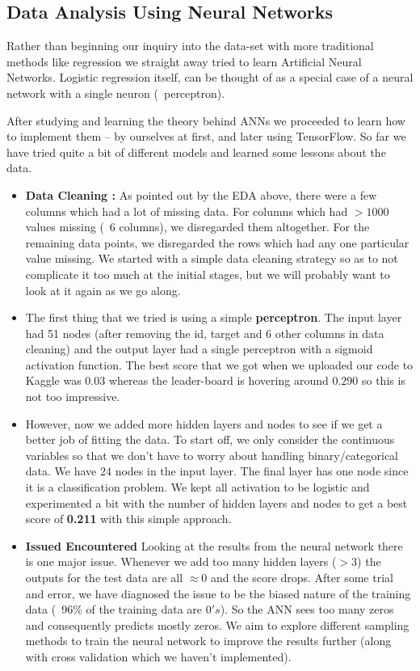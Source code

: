 \subsection{Data Analysis Using Neural Networks}

Rather than beginning our inquiry into the data-set with more traditional methods like regression we straight away tried to learn Artificial Neural Networks. Logistic regression itself, can be thought of as a special case of a neural network with a single neuron (~perceptron). 

After studying and learning the theory behind ANNs we proceeded to learn how to implement them -- by ourselves at first, and later using TensorFlow. So far we have tried quite a bit of different models and learned some lessons about the data.

\begin{itemize}

\item \textbf{Data Cleaning :} As pointed out by the EDA above, there were a few columns which had a lot of missing data. For columns which had $>1000$ values missing (~6 columns), we disregarded them altogether. For the remaining data points, we disregarded the rows which had any one particular value missing. We started with a simple data cleaning strategy so as to not complicate it too much at the initial stages, but we will probably want to look at it again as we go along.

\item The first thing that we tried is using a simple \textbf{perceptron}. The input layer had 51 nodes (after removing the id, target and 6 other columns in data cleaning) and the output layer had a single perceptron with a sigmoid activation function. The best score that we got when we uploaded our code to Kaggle was $0.03$ whereas the leader-board is hovering around $0.290$ so this is not too impressive.

\item However, now we added more hidden layers and nodes to see if we get a better job of fitting the data. To start off, we only consider the continuous variables so that we don't have to worry about handling binary/categorical data. We have $24$ nodes in the input layer. The final layer has one node  since it is a classification problem. We kept all activation to be logistic and experimented a bit with the number of hidden layers and nodes to get a best score of \textbf{0.211} with this simple approach.

\item \textbf{Issued Encountered}  Looking at the results from the neural network there is one major issue. Whenever we add too many hidden layers ($>3$) the outputs for the test data are all $\approx 0$ and the score drops. After some trial and error, we have diagnosed the issue to be the biased nature of the training data (~$96\%$ of the training data are $0's$). So the ANN sees too many zeros and consequently predicts mostly zeros. We aim to explore different sampling methods to train the neural network to improve the results further (along with cross validation which we haven't implemented).
\end{itemize}

